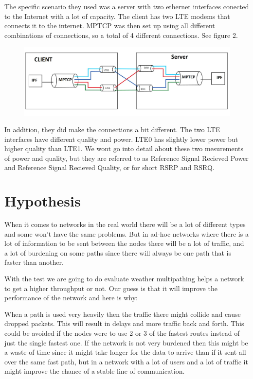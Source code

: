 \documentclass[11pt,twocolumn]{article}
\begin{document}
The specific scenario they used was a server with two ethernet interfaces conected to the Internet with a lot of capacity. The client has two LTE modems that connects it to the internet. MPTCP was then set up using all different combinations of connections, so a total of 4 different connections. See figure 2.
 
\begin{figure}[ht]
\begin{center}
\includegraphics[scale=0.26]{Figure_1}
\end{center}
\end{figure}

In addition, they did make the connections a bit different. The two LTE interfaces have different quality and power. LTE0 has slightly lower power but higher quality than LTE1. We wont go into detail about these two mesurements of power and quality, but they are referred to as Reference Signal Recieved Power and Reference Signal Recieved Quality, or for short RSRP and RSRQ.


\section{Hypothesis}

When it comes to networks in the real world there will be a lot of different types and some won't have the same problems. But in ad-hoc networks where there is a lot of information to be sent between the nodes there will be a lot of traffic, and a lot of burdening on some paths since there will always be one path that is faster than another.

With the test we are going to do evaluate weather multipathing helps a network to get a higher throughput or not. Our guess is that it will improve the performance of the network and here is why:

When a path is used very heavily then the traffic there might collide and cause dropped packets. This will result in delays and more traffic back and forth. This could be avoided if the nodes were to use 2 or 3 of the fastest routes instead of just the single fastest one. If the network is not very burdened then this might be a waste of time since it might take longer for the data to arrive than if it sent all over the same fast path, but in a network with a lot of users and a lot of traffic it might improve the chance of a stable line of communication.
\end{document}
